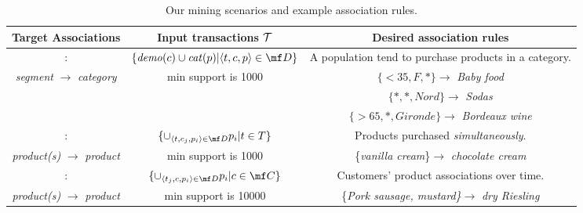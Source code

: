 \begin{table*}[th!]
	\centering
	\begin{tabular}{|c|c|c|}
		\hline
		\textbf{Target Associations}        & \textbf{Input transactions ${\cal T}$} & \textbf{Desired association rules}\\ \hline
		\demoassoc: & $ \{ \mathit{demo}(c) \cup \mathit{cat}(p) | \langle t, c, p \rangle\in\mf D\} $   &  A population tend to purchase products in a category. \\
		{\em segment} $\rightarrow$ {\em category}  &  min support is \num{1000}  &  $\{< 35, F, *\}\rightarrow$ {\em Baby food}  \\
	  &                                                                   &  $\{*, *, Nord\}\rightarrow$ {\em Sodas} \\
	  &                                                                   &  $\{> 65, *, Gironde\}\rightarrow$ {\em Bordeaux wine} \\
			\hline
	 	\prodassocreceipt:& \(\displaystyle  \{ \cup_{\langle t, c_j, p_i \rangle\in\mf D} p_i | t\in T\} \)   & Products purchased \emph{simultaneously}. \\
	  {\em product(s)} $\rightarrow$ {\em product}  &       min support is \num{1000}      & \{{\em vanilla cream}\}$\rightarrow$ {\em chocolate cream}\\
		\hline
		\prodassocclient: & \(\displaystyle  \{ \cup_{\langle t_j, c, p_i \rangle\in\mf D} p_i | c\in\mf C\} \)  &  Customers' product associations over time. \\
		{\em product(s)} $\rightarrow$ {\em product} 	&       min support is \num{10000}     & \{{\em Pork sausage, mustard\}}$\rightarrow$ {\em dry Riesling} \\
		\hline
	\end{tabular}
\caption{Our mining scenarios and example association rules.}
\label{tab:scenarios}
\end{table*}
